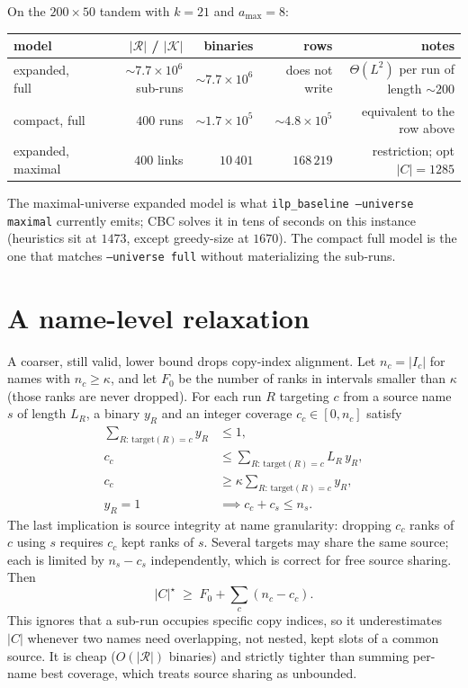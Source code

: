 \documentclass[11pt,a4paper]{article}
\theoremstyle{definition}
\theoremstyle{plain}
\theoremstyle{remark}
\newcommand{\Links}{\mathcal{K}}
\newcommand{\Runs}{\mathcal{R}}
\begin{document}
On the $200\times 50$ tandem with $k{=}21$ and $a_{\max}{=}8$:

\begin{center}
\begin{tabular}{@{}lrrrr@{}}
\toprule
model & $|\Runs|$ / $|\Links|$ & binaries & rows & notes \\
\midrule
expanded, full
  & ${\sim}7.7{\times}10^6$ sub-runs
  & ${\sim}7.7{\times}10^6$
  & does not write
  & $\Theta(L^2)$ per run of length ${\sim}200$ \\
compact, full
  & $400$ runs
  & ${\sim}1.7{\times}10^5$
  & ${\sim}4.8{\times}10^5$
  & equivalent to the row above \\
expanded, maximal
  & $400$ links
  & $10\,401$
  & $168\,219$
  & restriction; opt $|C|=1285$ \\
\bottomrule
\end{tabular}
\end{center}

The maximal-universe expanded model is what
\texttt{ilp\_baseline --universe maximal} currently emits; CBC solves it
in tens of seconds on this instance (heuristics sit at $1473$, except
greedy-size at $1670$). The compact full model is the one that matches
\texttt{--universe full} without materializing the sub-runs.

\section{A name-level relaxation}
\label{sec:name}

A coarser, still valid, lower bound drops copy-index alignment. Let
$n_c = |I_c|$ for names with $n_c \ge \kappa$, and let $F_0$ be the
number of ranks in intervals smaller than $\kappa$ (those ranks are
never dropped). For each run $R$ targeting $c$ from a source name $s$
of length $L_R$, a binary $y_R$ and an integer coverage $c_c \in [0,n_c]$
satisfy
\begin{align}
  \sum_{R:\,\mathrm{target}(R)=c} y_R &\le 1, \\
  c_c &\le \sum_{R:\,\mathrm{target}(R)=c} L_R\, y_R, \\
  c_c &\ge \kappa \sum_{R:\,\mathrm{target}(R)=c} y_R, \\
  y_R = 1 &\implies c_c + c_s \le n_s.
\end{align}
The last implication is source integrity at name granularity: dropping
$c_c$ ranks of $c$ using $s$ requires $c_c$ kept ranks of $s$. Several
targets may share the same source; each is limited by $n_s - c_s$
independently, which is correct for free source sharing. Then
\[
  |C|^\star \;\ge\; F_0 + \sum_c (n_c - c_c).
\]
This ignores that a sub-run occupies specific copy indices, so it
underestimates $|C|$ whenever two names need overlapping, not nested,
kept slots of a common source. It is cheap ($O(|\Runs|)$ binaries) and
strictly tighter than summing per-name best coverage, which treats
source sharing as unbounded.
\end{document}
